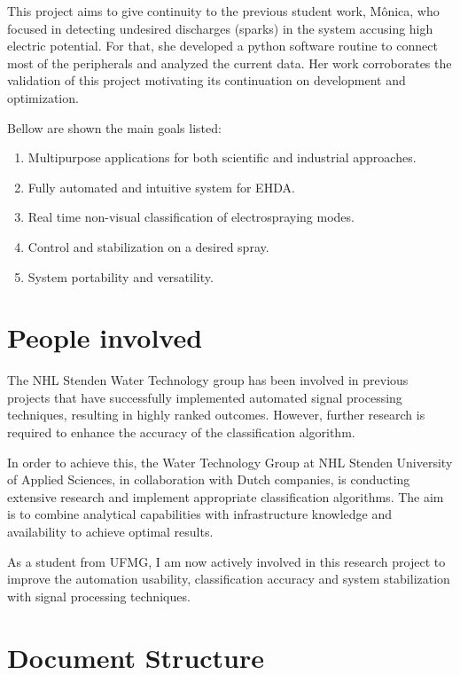 This project aims to give continuity to the previous student work\cite{Monica}, 
Mônica, who focused in detecting undesired discharges (sparks) in the system accusing high electric potential. 
For that, she developed a python software routine to connect most of the peripherals and analyzed the current data.
Her work corroborates the validation of this project motivating its continuation on development and optimization.

Bellow are shown the main goals listed:

\begin{enumerate}[]
\item Multipurpose applications for both scientific and industrial approaches.
\item Fully automated and intuitive system for EHDA.
\item Real time non-visual classification of electrospraying modes.
\item Control and stabilization on a desired spray. 
\item System portability and versatility.
\end{enumerate}


\section{People involved}
\label{sec:companies}

The NHL Stenden Water Technology group has been involved in previous projects that have successfully implemented automated signal processing techniques, resulting in highly ranked outcomes. 
However, further research is required to enhance the accuracy of the classification algorithm. 

In order to achieve this, the Water Technology Group at NHL Stenden University of Applied Sciences, in collaboration with Dutch companies, is conducting extensive research and implement appropriate classification algorithms. The aim is to combine analytical capabilities with infrastructure knowledge and availability to achieve optimal results.

As a student from UFMG, I am now actively involved in this research project to improve the automation usability, classification accuracy and system stabilization with signal processing techniques.

\section{Document Structure}
\label{sec:doc_struct}

